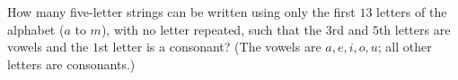 How many five-letter strings can be written using only the first $13$ letters of the alphabet ($a$ to $m$), with no letter repeated, such that the $3$rd and $5$th letters are vowels and the $1$st letter is a consonant? (The vowels are $a,e,i,o,u$; all other letters are consonants.)

